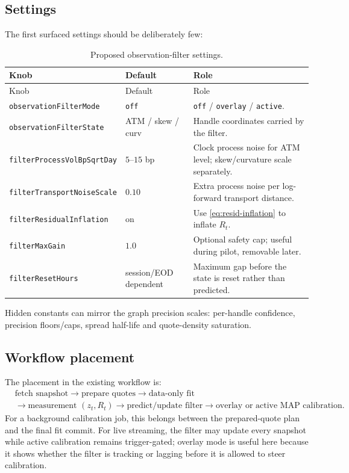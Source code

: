 \documentclass[11pt]{article}
\begin{document}
\subsection{Settings}

The first surfaced settings should be deliberately few:
\begingroup
\small
\begin{longtable}{p{}p{}p{}}
\caption{Proposed observation-filter settings.}\label{tab:settings}\\
\toprule Knob & Default & Role\\ \midrule
\endfirsthead \toprule Knob & Default & Role\\ \midrule \endhead
\texttt{observationFilterMode} & \texttt{off} &
\texttt{off} / \texttt{overlay} / \texttt{active}.\\
\texttt{observationFilterState} & ATM / skew / curv &
Handle coordinates carried by the filter.\\
\texttt{filterProcessVolBpSqrtDay} & $5$--$15$ bp &
Clock process noise for ATM level; skew/curvature scale separately.\\
\texttt{filterTransportNoiseScale} & $0.10$ &
Extra process noise per log-forward transport distance.\\
\texttt{filterResidualInflation} & on &
Use \eqref{eq:resid-inflation} to inflate $R_t$.\\
\texttt{filterMaxGain} & $1.0$ &
Optional safety cap; useful during pilot, removable later.\\
\texttt{filterResetHours} & session/EOD dependent &
Maximum gap before the state is reset rather than predicted.\\
\bottomrule
\end{longtable}
\endgroup

Hidden constants can mirror the graph precision scales: per-handle confidence,
precision floors/caps, spread half-life and quote-density saturation.

\subsection{Workflow placement}

The placement in the existing workflow is:
\[
\begin{aligned}
&\text{fetch snapshot}\to\text{prepare quotes}\to\text{data-only fit}\\
&\to\text{measurement }(z_t,R_t)
\to\text{predict/update filter}
\to\text{overlay or active MAP calibration}.
\end{aligned}
\]
For a background calibration job, this belongs between the prepared-quote plan
and the final fit commit. For live streaming, the filter may update every
snapshot while active calibration remains trigger-gated; overlay mode is useful
here because it shows whether the filter is tracking or lagging before it is
allowed to steer calibration.
\end{document}
